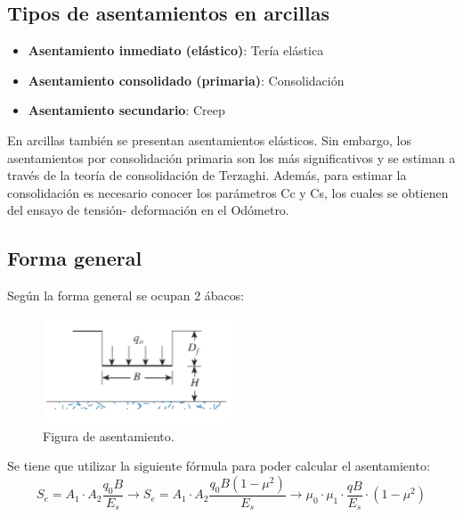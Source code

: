 \documentclass{article} %
\begin{document}
\subsection*{Tipos de asentamientos en arcillas}
\begin{itemize}
    \item \textbf{Asentamiento inmediato (elástico)}: Tería elástica
    \item \textbf{Asentamiento consolidado (primaria)}: Consolidación
    \item \textbf{Asentamiento secundario}: Creep
\end{itemize}

En arcillas también se presentan asentamientos elásticos.
Sin embargo, los asentamientos por consolidación primaria son los más
significativos y se estiman a través de la teoría de consolidación de
Terzaghi. Además, para estimar la consolidación es necesario conocer los
parámetros Cc y Cs, los cuales se obtienen del ensayo de tensión-
deformación en el Odómetro.

\subsection*{Forma general}
Según la forma general se ocupan 2 ábacos:

\begin{figure}[h]
    \centering
    \includegraphics[width=0.5\textwidth]{Graficos/asentamiento_3.PNG}
    \caption{Figura de asentamiento.}
    \label{fig:asentamiento1}
\end{figure}

Se tiene que utilizar la siguiente fórmula para poder calcular el asentamiento:
\[
S_e = A_1 \cdot A_2 \frac{q_0 B}{E_s} \rightarrow S_e = A_1 \cdot A_2 \frac{q_0 B (1 -\mu ^2)}{E_s} \rightarrow \mu_0 \cdot \mu_1 \cdot \frac{q B}{E_s} \cdot (1- \mu^2)
\]
\end{document}
